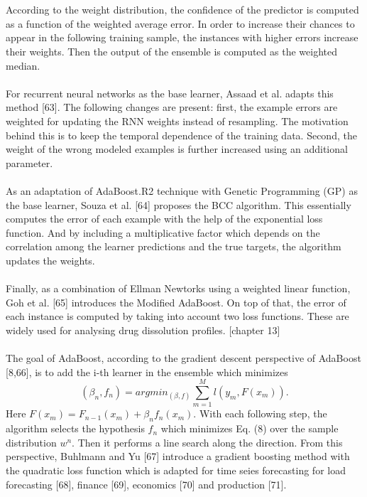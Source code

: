 \documentclass[runningheads,a4paper]{llncs}[2015/06/24]
\begin{document}
\hspace{1cm}\\\\According to the weight distribution, the confidence of the predictor is computed as a function of the weighted average error. In order to increase their chances to appear in the following training sample, the instances with higher errors increase their weights. Then the output of the ensemble is computed as the weighted median. \\\\ For recurrent neural networks as the base learner, Assaad et al. adapts this method [63]. The following changes are present: first, the example errors are weighted for updating the RNN weights instead of resampling. The motivation behind this is to keep the temporal dependence of the training data. Second, the weight of the wrong modeled examples is further increased using an additional parameter. \\\\ As an adaptation of AdaBoost.R2 technique with Genetic Programming (GP) as the base learner, Souza et al. [64] proposes the BCC algorithm. This essentially computes the error of each example with the help of the exponential loss function.  And by including a multiplicative factor which depends on the correlation among the learner predictions and the true targets, the algorithm updates the weights. \\\\ Finally, as a combination of Ellman Newtorks using a weighted linear function, Goh et al. [65] introduces the Modified AdaBoost. On top of that, the error of each instance is computed by taking into account two loss functions. These are widely used for analysing drug dissolution profiles. [chapter 13] \\\\ The goal of AdaBoost, according to the gradient descent perspective of AdaBoost [8,66], is to add the i-th learner in the ensemble which minimizes
\begin{equation}
(β_n, f_n)=argmin_{(β,f)} \sum_{m=1}^{M} l(y_m, F(x_m)).
\end{equation}
Here $F(x_m)=F_{n-1}(x_m)+ β_n f_n (x_m)$. With each following step, the algorithm selects the hypothesis $f_n$ which minimizes Eq. (8) over the sample distribution $w^n$. Then it performs a line search along the direction. From this perspective, Buhlmann and Yu [67] introduce a gradient boosting method with the quadratic loss function which is adapted for time seies forecasting for load forecasting [68], finance [69], economics [70] and production [71].
\end{document}
